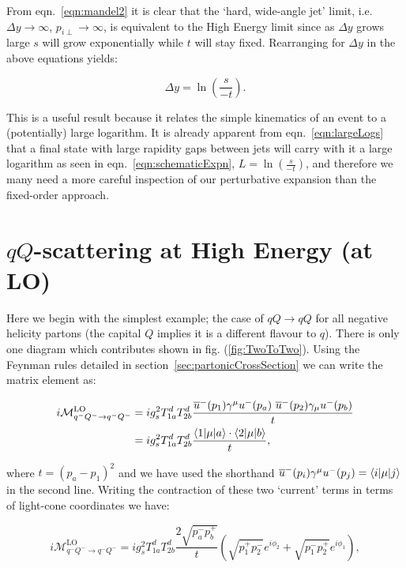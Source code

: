 		From  eqn.~\eqref{eqn:mandel2} it is clear that the `hard, wide-angle jet' limit, i.e. $\Delta y\to\infty$,
		$p_{i\perp}\to\infty$, is equivalent to the High Energy limit since as $\Delta y$ grows large $s$ will
		grow exponentially while $t$ will stay fixed.  Rearranging for $\Delta y$ in the above equations yields:

		\begin{equation}
			\Delta y = \ln \left(\frac{s}{-t}\right).
			\label{eqn:largeLogs}
		\end{equation}

		This is a useful result because it relates the simple kinematics of an event to a (potentially)
		large logarithm.  It is already apparent from eqn.~\eqref{eqn:largeLogs} that a final state
		with large rapidity gaps between jets will carry with it a large logarithm as seen in
		eqn.~\eqref{eqn:schematicExpn}, $L=\ln \left(\frac{s}{-t}\right)$, and therefore we many need a
		more careful inspection of our perturbative expansion than the fixed-order approach.

	\section{$qQ$-scattering at High Energy (at LO)}
		\label{sec:qQScat}

		Here we begin with the simplest example; the case of $qQ\rightarrow qQ$ for all negative helicity partons
		(the capital $Q$ implies it is a different flavour to $q$).  There is only one diagram which contributes shown
		in fig. (\ref{fig:TwoToTwo}).  Using the Feynman rules detailed in section~\ref{sec:partonicCrossSection} we can
		write the matrix element as:

		\begin{align}
			i\mathcal{M}_{q^-Q^-\rightarrow q^-Q^-}^{\text{LO}} &= ig_s^2T^d_{1a}T^d_{2b}\frac{\overline{u}^-(p_1)\gamma^\mu
			  u^-(p_a)\text{ }\overline{u}^-(p_2)\gamma_\mu u^-(p_b)}{t}\\
			  &= ig_s^2T^d_{1a}T^d_{2b}\frac{\langle 1 | \mu | a \rangle\cdot\langle 2 | \mu | b \rangle}{t},
			  \label{eqn:similarBrackets}
		\end{align}

		where $t = (p_a - p_1)^2$ and we have used the shorthand $\overline{u}^-(p_i)\gamma^\mu u^-(p_j) = \langle i | \mu | j \rangle$ in the second line.
		Writing the contraction of these two `current' terms in terms of light-cone coordinates we have:

		\begin{equation}
			i\mathcal{M}_{q^-Q^-\rightarrow q^-Q^-}^{\text{LO}} = ig_s^2T^d_{1a}T^d_{2b}\frac{2\sqrt{p_a^-p_b^+}}{t}
			\left(\sqrt{p_1^+p_2^-}e^{i\phi_2} + \sqrt{p_1^-p_2^+}e^{i\phi_1}\right),
			\label{eqn:qQ2qQ}
		\end{equation}

